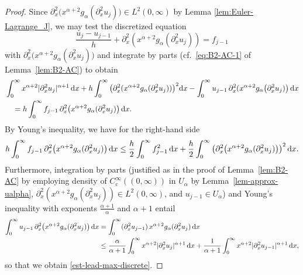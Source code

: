 \documentclass[reqno,12pt]{amsart}
\renewcommand{\d}{\ensuremath{\mathrm{d}}}
\renewcommand{\d}{\ensuremath{{\rm d}}}
\numberwithin{equation}{section}
\begin{document}
\begin{proof}
Since $\partial_x^2\bigl(x^{\alpha+2} g_\alpha(\partial_x^2 u_j)\bigr) \in L^2(0,\infty)$ by Lemma \ref{lem:Euler-Lagrange_J}, we may test the discretized equation
%
\begin{equation*}
    \frac{u_j - u_{j-1}}{h} 
    +
    \partial_x^2 \left(
    x^{\alpha+2} g_\alpha(\partial_x^2 u_j)
    \right)
    =
    f_{j-1}
\end{equation*}
%
with $\partial_x^2\bigl(x^{\alpha+2} g_\alpha(\partial_x^2 u_j)\bigr)$ and integrate by parts (cf.~\eqref{eq:B2-AC-1} of Lemma~\ref{lem:B2-AC}) to obtain
\begin{equation*}
\begin{split}
    &\int_0^\infty x^{\alpha+2} |\partial_x^2 u_{j}|^{\alpha+1}\, \d x
    +
    h \int_0^\infty \big(\partial_x^2(x^{\alpha+2} g_\alpha(\partial_x^2 u_j))\big)^2 \d x
    -
    \int_0^\infty u_{j-1}\, \partial_x^2(x^{\alpha+2} g_\alpha\big(\partial_x^2 u_j)\big)\, \d x
    \\
    & \quad =
    h\int_0^\infty f_{j-1}\, \partial_x^2\big(x^{\alpha+2} g_\alpha(\partial_x^2 u_j)\big)\, \d x.
\end{split}
\end{equation*}
%
By Young's inequality, we have for the right-hand side
%
\begin{equation*}
h\int_0^\infty f_{j-1}\, \partial_x^2\big(x^{\alpha+2} g_\alpha(\partial_x^2 u_j)\big)\, \d x
\le \frac h 2 \int_0^\infty f_{j-1}^2 \, \d x
+ \frac h 2 \int_0^\infty \big(\partial_x^2\big(x^{\alpha+2}
g_\alpha(\partial_x^2 u_j)\big)\big)^2 \, \d x.  
\end{equation*}
%
Furthermore, integration by parts (justified as in the proof of Lemma~\ref{lem:B2-AC} by employing density of $C^\infty_\mathrm{c}((0,\infty))$ in $U_\alpha$ by Lemma~\ref{lem-approx-ualpha},
$\partial_x^2(x^{\alpha+2} g_\alpha(\partial_x^2 u_j)) \in L^2(0,\infty)$, and $u_{j-1} \in U_\alpha$)
and Young's inequality with exponents $\frac{\alpha+1}{\alpha}$ and $\alpha+1$ entail
%
\begin{equation*}
\begin{split}
    \int_0^\infty u_{j-1}\, \partial_x^2\big(x^{\alpha+2} g_\alpha(\partial_x^2 u_j)\big)\, \d x
    &=
    \int_0^\infty (\partial_x^2 u_{j-1}) \, x^{\alpha+2} g_\alpha(\partial_x^2 u_j) \, \d x
    \\
    &\leq
    \frac{\alpha}{\alpha+1} \int_0^\infty x^{\alpha+2} |\partial_x^2 u_j|^{\alpha+1}\, \d x
    +
    \frac{1}{\alpha+1} \int_0^\infty x^{\alpha+2} |\partial_x^2 u_{j-1}|^{\alpha+1}\, \d x,
\end{split} 
\end{equation*}
%
so that we obtain \eqref{est-lead-max-discrete}.
\end{proof}
%
\end{document}
